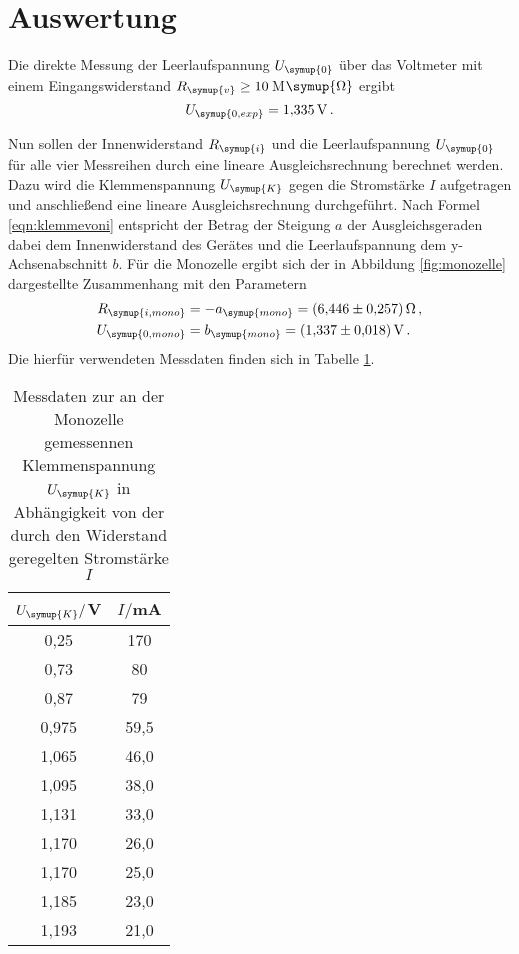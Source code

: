 \section{Auswertung}
\label{sec:Auswertung}

Die direkte Messung der Leerlaufspannung $U_{\symup{0}}$ über das Voltmeter
mit einem Eingangswiderstand $R_{\symup{v}}\geq10$\,M$\symup{\Omega}$ ergibt
\begin{equation}
  U_{\symup{0,exp}} = \SI{1.335}{\volt}\,.
\end{equation}


Nun sollen der Innenwiderstand $R_{\symup{i}}$ und die Leerlaufspannung $U_{\symup{0}}$
für alle vier Messreihen durch eine lineare Ausgleichsrechnung berechnet werden.
Dazu wird die Klemmenspannung $U_{\symup{K}}$ gegen die Stromstärke $I$ aufgetragen
und anschließend eine lineare Ausgleichsrechnung durchgeführt.
Nach Formel \eqref{eqn:klemmevoni} entspricht der Betrag der Steigung $a$ der Ausgleichsgeraden dabei dem Innenwiderstand des
Gerätes und die Leerlaufspannung dem y-Achsenabschnitt $b$. Für die Monozelle
ergibt sich der in Abbildung \ref{fig:monozelle} dargestellte Zusammenhang mit den
Parametern
\begin{align}
  R_{\symup{i,mono}}&=-a_{\symup{mono}} = \SI{6.446(0257)}{\ohm} \,, \\
  U_{\symup{0,mono}}&=b_{\symup{mono}} = \SI{1.337(0018)}{\volt} \,.
\end{align}
Die hierfür verwendeten Messdaten finden sich in Tabelle \ref{tab:monozelle}.

\begin{table}
  \centering
  \caption{Messdaten zur an der Monozelle gemessennen Klemmenspannung $U_{\symup{K}}$
  in Abhängigkeit von der durch den Widerstand geregelten Stromstärke $I$}
  \label{tab:monozelle}
  \begin{tabular}{c c}
    \toprule
    $U_{\symup{K}}/$V & $I/$mA\\
    \midrule
    0,25	&  170\\
    0,73	&  80\\
    0,87	&  79\\
    0,975	& 59,5\\
    1,065	& 46,0\\
    1,095	& 38,0\\
    1,131	& 33,0\\
    1,170	& 26,0\\
    1,170	& 25,0\\
    1,185	& 23,0\\
    1,193	& 21,0\\
    \bottomrule
  \end{tabular}
\end{table}

